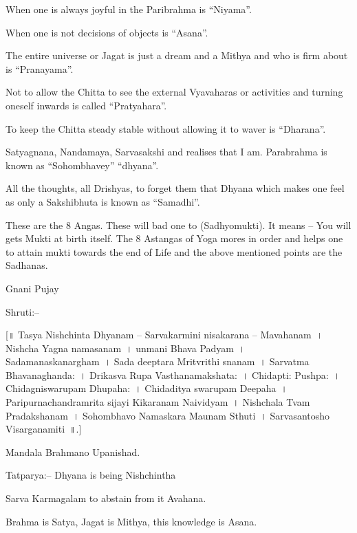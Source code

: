 \item When one is always joyful in the Paribrahma is “Niyama”.

 \item When one is not decisions of objects is “Asana”.

 \item The entire universe or Jagat is just a dream and a Mithya and who is firm about is “Pranayama”.

 \item Not to allow the Chitta to see the external Vyavaharas or activities and turning oneself inwards is called “Pratyahara”.

 \item To keep the Chitta steady stable without allowing it to waver is “Dharana”.

 \item Satyagnana, Nandamaya, Sarvasakshi and realises that I am. Parabrahma is known as “Sohombhavey” “dhyana”.

 \item All the thoughts, all Drishyas, to forget them that Dhyana which makes one feel as only a Sakshibhuta is known as “Samadhi”.

 \item These are the 8 Angas. These will bad one to (Sadhyomukti). It means – You will gets Mukti at birth itself. The 8 Astangas of Yoga mores in order and helps one to attain mukti towards the end of Life and the above mentioned points are the Sadhanas.


Gnani Pujay

Shruti:–

[॥ Tasya Nishchinta Dhyanam – Sarvakarmini nisakarana – Mavahanam~। Nishcha Yagna namasanam~। unmani Bhava Padyam~। Sadamanaskanargham~। Sada deeptara Mritvrithi snanam~। Sarvatma Bhavanaghanda:~। Drikasva Rupa Vasthanamakshata:~। Chidapti: Pushpa:~। Chidagniswarupam Dhupaha:~। Chidaditya swarupam Deepaha~। Paripurnachandramrita sijayi Kikaranam Naividyam~। Nishchala Tvam Pradakshanam~। Sohombhavo Namaskara Maunam Sthuti~। Sarvasantosho Visarganamiti~॥.]

Mandala Brahmano Upanishad.

Tatparya:– Dhyana is being Nishchintha

\item Sarva Karmagalam to abstain from it Avahana.

 \item Brahma is Satya, Jagat is Mithya, this knowledge is Asana.

